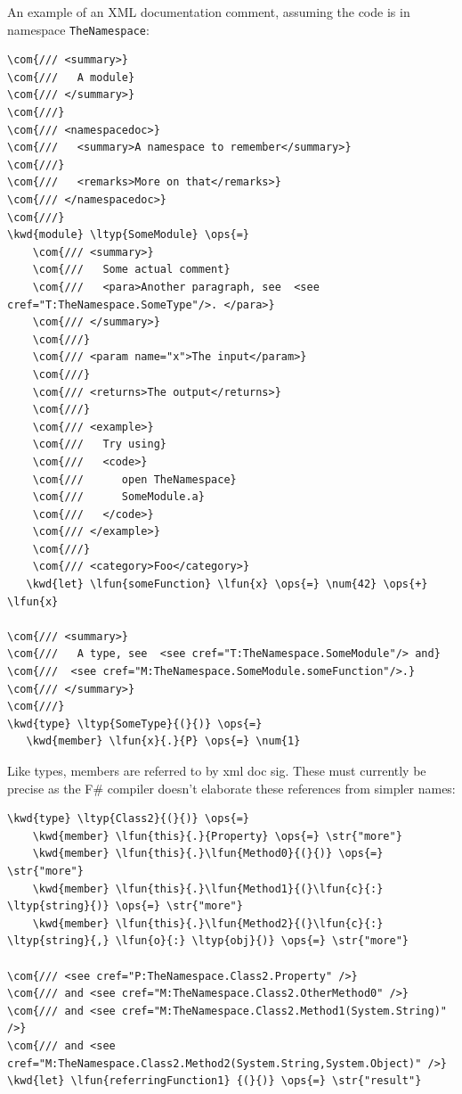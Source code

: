 \documentclass{article}
\newcommand{\com}[1]{\textcolor{officegreen}{#1}}
\newcommand{\kwd}[1]{\textcolor{navy}{#1}}
\newcommand{\num}[1]{\textcolor{officegreen}{#1}}
\newcommand{\ops}[1]{\textcolor{purple}{#1}}
\newcommand{\str}[1]{\textcolor{olive}{#1}}
\begin{document}
An example of an XML documentation comment, assuming the code is in namespace \texttt{TheNamespace}:
\begin{Verbatim}[commandchars=\\\{\}]
\com{/// <summary>}
\com{///   A module}
\com{/// </summary>}
\com{///}
\com{/// <namespacedoc>}
\com{///   <summary>A namespace to remember</summary>}
\com{///}
\com{///   <remarks>More on that</remarks>}
\com{/// </namespacedoc>}
\com{///}
\kwd{module} \ltyp{SomeModule} \ops{=}
    \com{/// <summary>}
    \com{///   Some actual comment}
    \com{///   <para>Another paragraph, see  <see cref="T:TheNamespace.SomeType"/>. </para>}
    \com{/// </summary>}
    \com{///}
    \com{/// <param name="x">The input</param>}
    \com{///}
    \com{/// <returns>The output</returns>}
    \com{///}
    \com{/// <example>}
    \com{///   Try using}
    \com{///   <code>}
    \com{///      open TheNamespace}
    \com{///      SomeModule.a}
    \com{///   </code>}
    \com{/// </example>}
    \com{///}
    \com{/// <category>Foo</category>}
   \kwd{let} \lfun{someFunction} \lfun{x} \ops{=} \num{42} \ops{+} \lfun{x}

\com{/// <summary>}
\com{///   A type, see  <see cref="T:TheNamespace.SomeModule"/> and}
\com{///  <see cref="M:TheNamespace.SomeModule.someFunction"/>.}
\com{/// </summary>}
\com{///}
\kwd{type} \ltyp{SomeType}{(}{)} \ops{=}
   \kwd{member} \lfun{x}{.}{P} \ops{=} \num{1}
\end{Verbatim}



Like types, members are referred to by xml doc sig.  These must currently be precise as the F\#
compiler doesn't elaborate these references from simpler names:
\begin{Verbatim}[commandchars=\\\{\}]
\kwd{type} \ltyp{Class2}{(}{)} \ops{=}
    \kwd{member} \lfun{this}{.}{Property} \ops{=} \str{"more"}
    \kwd{member} \lfun{this}{.}\lfun{Method0}{(}{)} \ops{=} \str{"more"}
    \kwd{member} \lfun{this}{.}\lfun{Method1}{(}\lfun{c}{:} \ltyp{string}{)} \ops{=} \str{"more"}
    \kwd{member} \lfun{this}{.}\lfun{Method2}{(}\lfun{c}{:} \ltyp{string}{,} \lfun{o}{:} \ltyp{obj}{)} \ops{=} \str{"more"}

\com{/// <see cref="P:TheNamespace.Class2.Property" />}
\com{/// and <see cref="M:TheNamespace.Class2.OtherMethod0" />}
\com{/// and <see cref="M:TheNamespace.Class2.Method1(System.String)" />}
\com{/// and <see cref="M:TheNamespace.Class2.Method2(System.String,System.Object)" />}
\kwd{let} \lfun{referringFunction1} {(}{)} \ops{=} \str{"result"}
\end{Verbatim}
\end{document}
